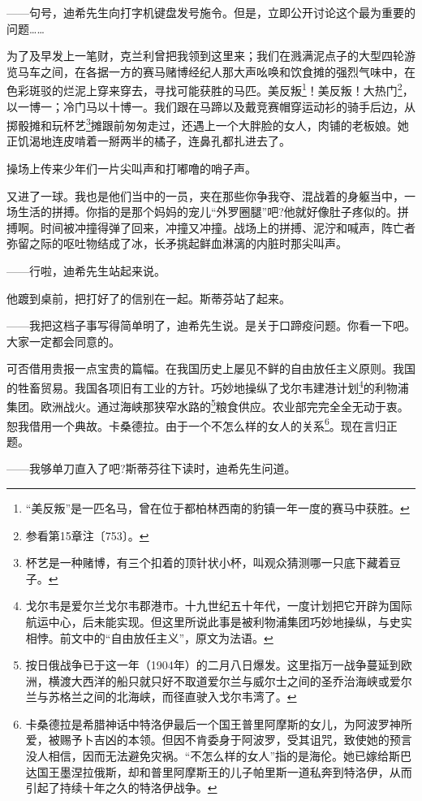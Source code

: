 \par ——句号，迪希先生向打字机键盘发号施令。但是，立即公开讨论这个最为重要的问题……
\par 为了及早发上一笔财，克兰利曾把我领到这里来；我们在溅满泥点子的大型四轮游览马车之间，在各据一方的赛马赌博经纪人那大声吆唤和饮食摊的强烈气味中，在色彩斑驳的烂泥上穿来穿去，寻找可能获胜的马匹。美反叛\footnote{“美反叛”是一匹名马，曾在位于都柏林西南的豹镇一年一度的赛马中获胜。}！美反叛！大热门\footnote{参看第15章注〔753〕。}，以一博一；冷门马以十博一。我们跟在马蹄以及戴竞赛帽穿运动衫的骑手后边，从掷骰摊和玩杯艺\footnote{杯艺是一种赌博，有三个扣着的顶针状小杯，叫观众猜测哪一只底下藏着豆子。}摊跟前匆匆走过，还遇上一个大胖脸的女人，肉铺的老板娘。她正饥渴地连皮啃着一掰两半的橘子，连鼻孔都扎进去了。
\par 操场上传来少年们一片尖叫声和打嘟噜的哨子声。
\par 又进了一球。我也是他们当中的一员，夹在那些你争我夺、混战着的身躯当中，一场生活的拼搏。你指的是那个妈妈的宠儿“外罗圈腿”吧?他就好像肚子疼似的。拼搏啊。时间被冲撞得弹了回来，冲撞又冲撞。战场上的拼搏、泥泞和喊声，阵亡者弥留之际的呕吐物结成了冰，长矛挑起鲜血淋漓的内脏时那尖叫声。
\par ——行啦，迪希先生站起来说。
\par 他踱到桌前，把打好了的信别在一起。斯蒂芬站了起来。
\par ——我把这档子事写得简单明了，迪希先生说。是关于口蹄疫问题。你看一下吧。大家一定都会同意的。
\par 可否借用贵报一点宝贵的篇幅。在我国历史上屡见不鲜的自由放任主义原则。我国的牲畜贸易。我国各项旧有工业的方针。巧妙地操纵了戈尔韦建港计划\footnote{戈尔韦是爱尔兰戈尔韦郡港市。十九世纪五十年代，一度计划把它开辟为国际航运中心，后未能实现。但这里所说此事是被利物浦集团巧妙地操纵，与史实相悖。前文中的“自由放任主义”，原文为法语。}的利物浦集团。欧洲战火。通过海峡那狭窄水路的\footnote{按日俄战争已于这一年（1904年）的二月八日爆发。这里指万一战争蔓延到欧洲，横渡大西洋的船只就只好不取道爱尔兰与威尔士之间的圣乔治海峡或爱尔兰与苏格兰之间的北海峡，而径直驶入戈尔韦湾了。}粮食供应。农业部完完全全无动于衷。恕我借用一个典故。卡桑德拉。由于一个不怎么样的女人的关系\footnote{卡桑德拉是希腊神话中特洛伊最后一个国王普里阿摩斯的女儿，为阿波罗神所爱，被赐予卜吉凶的本领。但因不肯委身于阿波罗，受其诅咒，致使她的预言没人相信，因而无法避免灾祸。“不怎么样的女人”指的是海伦。她已嫁给斯巴达国王墨涅拉俄斯，却和普里阿摩斯王的儿子帕里斯一道私奔到特洛伊，从而引起了持续十年之久的特洛伊战争。}。现在言归正题。
\par ——我够单刀直入了吧?斯蒂芬往下读时，迪希先生问道。
